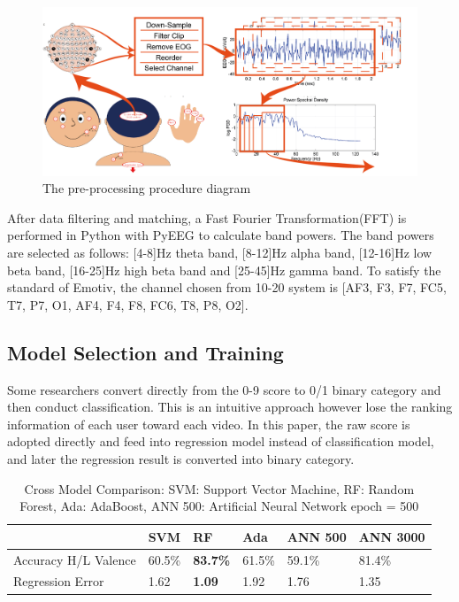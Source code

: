 \documentclass[a4paper]{article}
\begin{document}
\begin{figure}
	\centering
	\includegraphics[width=\linewidth]{Diagram_FFT}
	\caption{The pre-processing procedure diagram}
	\label{fig:FFT}
\end{figure}

After data filtering and matching, a Fast Fourier Transformation(FFT) is performed in Python with PyEEG to calculate band powers. The band powers are selected as follows: [4-8]Hz theta band, [8-12]Hz alpha band, [12-16]Hz low beta band, [16-25]Hz high beta band and [25-45]Hz gamma band. To satisfy the standard of Emotiv, the channel chosen from 10-20 system is [AF3, F3, F7, FC5, T7, P7, O1, AF4, F4, F8, FC6, T8, P8, O2].

\subsection{Model Selection and Training}

Some researchers convert directly from the 0-9 score to 0/1 binary category and then conduct classification. This is an intuitive approach however lose the ranking information of each user toward each video. In this paper, the raw score is adopted directly and feed into regression model instead of classification model, and later the regression result is converted into binary category. 

\begin{table}[]
\begin{tabular}{llllll}
\hline
& SVM & RF & Ada & ANN 500 & ANN 3000 \\ \hline
Accuracy H/L Valence & 60.5\%                 & \textbf{83.7\%}         & 61.5\%   & 59.1\%         & 81.4\%          \\
Regression Error          & 1.62                   & \textbf{1.09}          & 1.92     & 1.76           & 1.35 \\ \hline           
\end{tabular}
\caption{Cross Model Comparison: SVM: Support Vector Machine, RF: Random Forest, Ada: AdaBoost, ANN 500: Artificial Neural Network epoch = 500}
\end{table}
\end{document}
